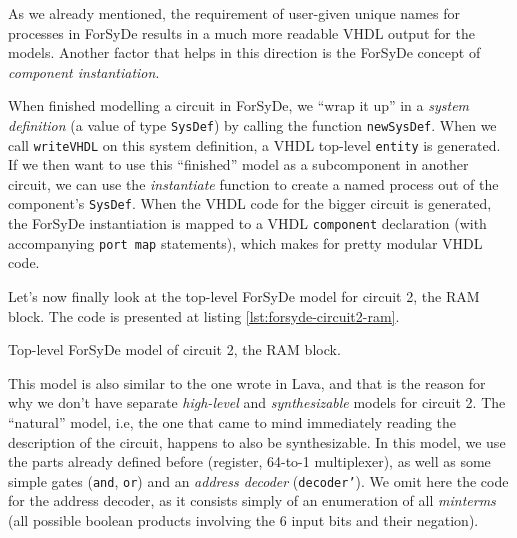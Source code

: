 \documentclass[a4paper]{article}
\begin{document}
                As we already mentioned, the requirement of user-given unique names for processes in
                ForSyDe results in a much more readable VHDL output for the models. Another factor
                that helps in this direction is the ForSyDe concept of \emph{component
                    instantiation}.

                When finished modelling a circuit in ForSyDe, we ``wrap it up''
                in a \emph{system definition} (a value of type \texttt{SysDef}) by calling the
                function \texttt{newSysDef}. When we call \texttt{writeVHDL} on this system
                definition, a VHDL top-level \texttt{entity} is generated. If we then want to use
                this ``finished'' model as a subcomponent in another circuit, we can use the
                \emph{instantiate} function to create a named process out of the component's
                \texttt{SysDef}. When the VHDL code for the bigger circuit is generated, the ForSyDe
                instantiation is mapped to a VHDL \texttt{component} declaration (with accompanying
                \texttt{port map} statements), which makes for pretty modular VHDL code.

                Let's now finally look at the top-level ForSyDe model for circuit 2, the RAM block.
                The code is presented at listing \ref{lst:forsyde-circuit2-ram}.

                \begin{listing}[h!]
                    \caption{Top-level ForSyDe model of circuit 2, the RAM block.
                        \label{lst:forsyde-circuit2-ram}}
                \end{listing}

                This model is also similar to the one wrote in Lava, and that is the
                reason for why we don't have separate \emph{high-level} and \emph{synthesizable}
                models for circuit 2. The ``natural'' model, i.e, the one that came to mind
                immediately reading the description of the circuit, happens to also be
                synthesizable. In this model, we use the parts already defined before (register,
                64-to-1 multiplexer), as well as some simple gates (\texttt{and}, \texttt{or}) and
                an \emph{address decoder} (\texttt{decoder'}). We omit here the code for the address
                decoder, as it consists simply of an enumeration of all \emph{minterms} (all
                possible boolean products involving the 6 input bits and their negation).
\end{document}

